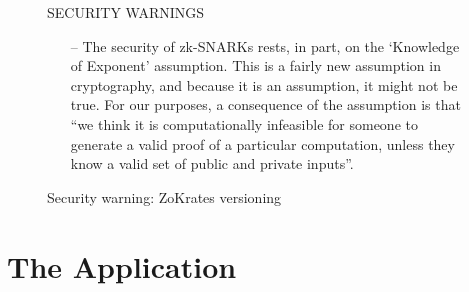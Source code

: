 \documentclass{article}
\begin{document}
\begin{figure}[H]
  \begin{center}
    \begin{mdframed}[backgroundcolor=verylightred]
      \noindent
      SECURITY WARNINGS
        \begin{itemize}
          \item[--] The security of zk-SNARKs rests, in part, on the `Knowledge of Exponent' assumption. This is a fairly new assumption in cryptography, and because it is an assumption, it might not be true. For our purposes, a consequence of the assumption is that ``we think it is computationally infeasible for someone to generate a valid proof of a particular computation, unless they know a valid set of public and private inputs''.
        \end{itemize}
    \end{mdframed}
  \end{center}
  \caption{Security warning: ZoKrates versioning}
  \label{fig:trustedSetupWarning}
\end{figure}









\newpage
\part{The Application}
\label{part:theApplication}
\parttoc

\newpage
\end{document}
